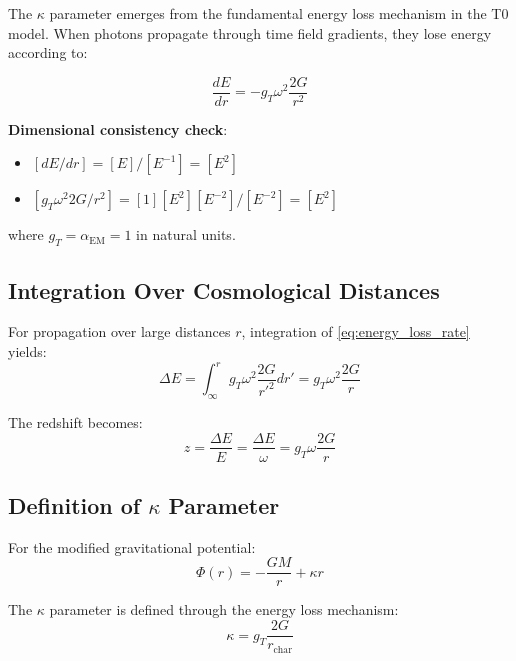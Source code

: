 \documentclass[12pt,a4paper]{article}
\newcommand{\alphaEM}{\alpha_{\text{EM}}}
\newcommand{\kappaparam}{\kappa}
\begin{document}
	The $\kappa$ parameter emerges from the fundamental energy loss mechanism in the T0 model. When photons propagate through time field gradients, they lose energy according to:
	
	\begin{equation}
		\frac{dE}{dr} = -g_T \omega^2 \frac{2G}{r^2}
		\label{eq:energy_loss_rate}
	\end{equation}
	
	\textbf{Dimensional consistency check}:
	\begin{itemize}
		\item $[dE/dr] = [E]/[E^{-1}] = [E^2]$
		\item $[g_T \omega^2 2G/r^2] = [1][E^2][E^{-2}]/[E^{-2}] = [E^2]$ \checkmark
	\end{itemize}
	
	where $g_T = \alphaEM = 1$ in natural units.
	
	\subsection{Integration Over Cosmological Distances}
	\label{subsec:cosmological_integration}
	
	For propagation over large distances $r$, integration of \cref{eq:energy_loss_rate} yields:
	\begin{equation}
		\Delta E = \int_{\infty}^{r} g_T \omega^2 \frac{2G}{r'^2} dr' = g_T \omega^2 \frac{2G}{r}
	\end{equation}
	
	The redshift becomes:
	\begin{equation}
		z = \frac{\Delta E}{E} = \frac{\Delta E}{\omega} = g_T \omega \frac{2G}{r}
		\label{eq:redshift_basic}
	\end{equation}
	
	\subsection{Definition of $\kappa$ Parameter}
	\label{subsec:kappa_definition}
	
	For the modified gravitational potential:
	\begin{equation}
		\Phi(r) = -\frac{GM}{r} + \kappaparam r
		\label{eq:modified_potential}
	\end{equation}
	
	The $\kappa$ parameter is defined through the energy loss mechanism:
	\begin{equation}
		\kappaparam = g_T \frac{2G}{r_{\text{char}}}
		\label{eq:kappa_definition}
	\end{equation}
	
\end{document}
